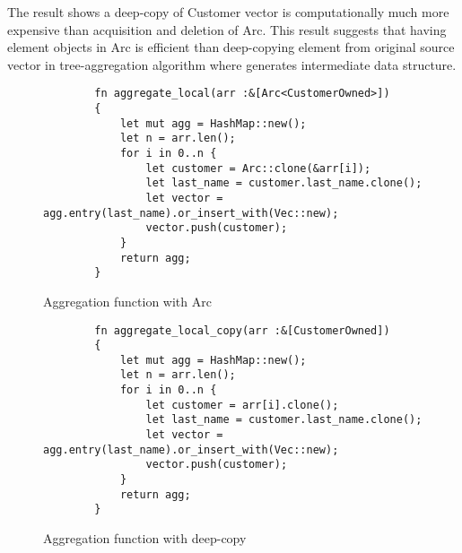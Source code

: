 The result shows a deep-copy of Customer vector is computationally much more expensive than acquisition and deletion of Arc. 
This result suggests that having element objects in Arc is efficient than deep-copying element from original source vector in tree-aggregation algorithm 
where generates intermediate data structure. 


\begin{figure}[htb]
    \begin{lstlisting}
        fn aggregate_local(arr :&[Arc<CustomerOwned>]) 
        {   
            let mut agg = HashMap::new();
            let n = arr.len();
            for i in 0..n {
                let customer = Arc::clone(&arr[i]);
                let last_name = customer.last_name.clone();
                let vector = agg.entry(last_name).or_insert_with(Vec::new);
                vector.push(customer);
            }
            return agg;
        }
    \end{lstlisting}
    \caption{Aggregation function with Arc}
    \label{fig:Sampling}
\end{figure}


\begin{figure}[htb]
    \begin{lstlisting}
        fn aggregate_local_copy(arr :&[CustomerOwned]) 
        {   
            let mut agg = HashMap::new();
            let n = arr.len();
            for i in 0..n {
                let customer = arr[i].clone();
                let last_name = customer.last_name.clone();
                let vector = agg.entry(last_name).or_insert_with(Vec::new);
                vector.push(customer);
            }
            return agg;
        }
    \end{lstlisting}
    \caption{Aggregation function with deep-copy}
    \label{fig:Sampling}
\end{figure}